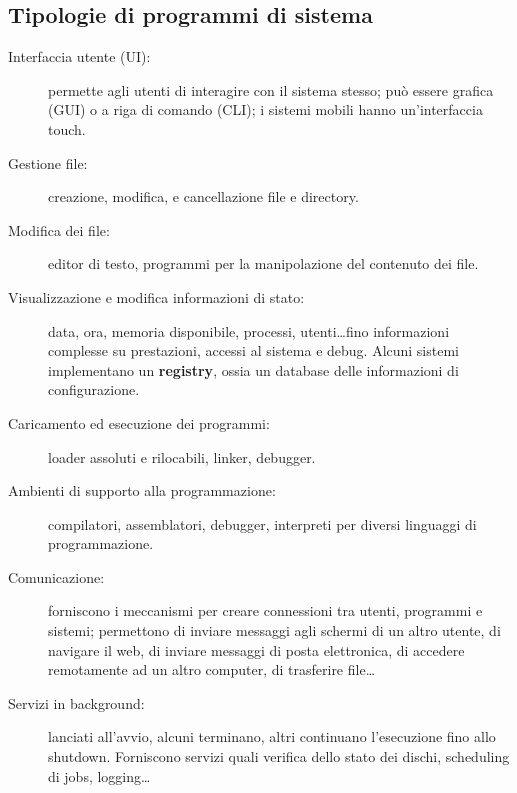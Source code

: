 \subsection{Tipologie di programmi di sistema}
\begin{description}
    \item[Interfaccia utente (UI):] permette agli utenti di interagire con il sistema stesso; può essere grafica (GUI) o a riga di comando (CLI); i sistemi mobili hanno un'interfaccia touch.
    \item[Gestione file:] creazione, modifica, e cancellazione file e directory.
    \item[Modifica dei file:] editor di testo, programmi per la manipolazione del contenuto dei file.
    \item[Visualizzazione e modifica informazioni di stato:] data, ora, memoria disponibile, processi, utenti\dots fino informazioni complesse su prestazioni, accessi al sistema e debug. Alcuni sistemi implementano un \textbf{registry}, ossia un database delle informazioni di configurazione.
    \item[Caricamento ed esecuzione dei programmi:] loader assoluti e rilocabili, linker, debugger.
    \item[Ambienti di supporto alla programmazione:] compilatori, assemblatori, debugger, interpreti per diversi linguaggi di programmazione.
    \item[Comunicazione:] forniscono i meccanismi per creare connessioni tra utenti, programmi e sistemi; permettono di inviare messaggi agli schermi di un altro utente, di navigare il web, di inviare messaggi di posta elettronica, di accedere remotamente ad un altro computer, di trasferire file\dots
    \item[Servizi in background:] lanciati all'avvio, alcuni terminano, altri continuano l'esecuzione fino allo shutdown. Forniscono servizi quali verifica dello stato dei dischi, scheduling di jobs, logging\dots
\end{description}

